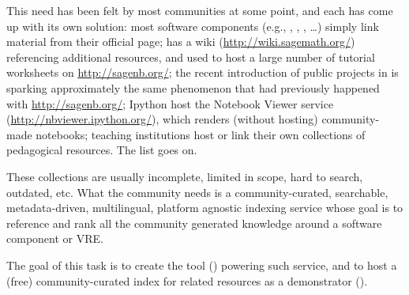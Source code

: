 \begin{workpackage}[id=dissem,wphases=18-48!.5,
  title=Dissemination and Community Building,
  lead=PS,
  PSRM=10, %
  SARM=18,
  USORM=10,
  USHRM=8,
  USRM=24,
  UVRM=2,
  UBRM=4,
]
\begin{tasklist}
\begin{task}[title=Demonstrator: Computational mathematics resources indexing service,
id=index-librorum-salvificorum]
This need has been felt by most communities at some point, and each
has come up with its own solution: most software components (e.g.,
\GAP, \PariGP, \Sage, \dots) simply link material from their official
page; \Sage has a wiki (\url{http://wiki.sagemath.org/}) referencing
additional resources, and used to host a large number of tutorial
worksheets on \url{http://sagenb.org/}; the recent introduction of
public projects in \SMC is sparking approximately the same phenomenon
that had previously happened with \url{http://sagenb.org/}; Ipython
host the Notebook Viewer service (\url{http://nbviewer.ipython.org/}),
which renders (without hosting) community-made notebooks; teaching
institutions host or link their own collections of pedagogical
resources. The list goes on.

These collections are usually incomplete, limited in scope, hard to
search, outdated, etc.  What the community needs is a
community-curated, searchable, metadata-driven, multilingual, platform
agnostic indexing service whose goal is to reference and rank all the
community generated knowledge around a software component or VRE.  

The goal of this task is to create the tool
() powering such service, and to host a
(free) community-curated index for \TheProject related resources as a
demonstrator ().

\end{task}
\end{tasklist}




\end{workpackage}
